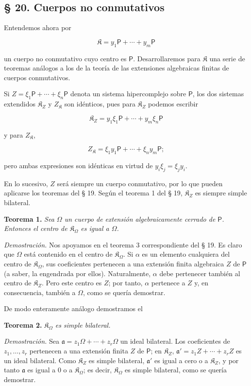 \subsection*{§ 20. Cuerpos no conmutativos}\label{nichtkommutative-koerper}

Entendemos ahora por

\[
\mathfrak K=y_1\mathsf P+\cdots+y_m\mathsf P
\]

un cuerpo no conmutativo cuyo centro es \(\mathsf P\). Desarrollaremos para \(\mathfrak K\) una serie de teoremas análogos a los de la teoría de las extensiones algebraicas finitas de cuerpos conmutativos.

Si \(Z=\xi_1\mathsf P+\cdots+\xi_n\mathsf P\) denota un sistema hipercomplejo sobre \(\mathsf P\), los dos sistemas extendidos \(\mathfrak K_Z\) y \(Z_{\mathfrak K}\) son idénticos, pues para \(\mathfrak K_Z\) podemos escribir

\[
\mathfrak K_Z=y_1\xi_1\mathsf P+\cdots+y_m\xi_n\mathsf P
\]

y para \(Z_{\mathfrak K}\),

\[
Z_{\mathfrak K}=\xi_1y_1\mathsf P+\cdots+\xi_ny_m\mathsf P;
\]

pero ambas expresiones son idénticas en virtud de \(y_i\xi_j=\xi_jy_i\).

En lo sucesivo, \(Z\) será siempre un cuerpo conmutativo, por lo que pueden aplicarse los teoremas del § 19. Según el teorema 1 del § 19, \(\mathfrak K_Z\) es siempre simple bilateral.

\textbf{Teorema 1.} \emph{Sea \(\Omega\) un cuerpo de extensión algebraicamente cerrado de \(\mathsf P\). Entonces el centro de \(\mathfrak K_\Omega\) es igual a \(\Omega\).}

\emph{Demostración.} Nos apoyamos en el teorema 3 correspondiente del § 19. Es claro que \(\Omega\) está contenido en el centro de \(\mathfrak K_\Omega\). Si \(\alpha\) es un elemento cualquiera del centro de \(\mathfrak K_\Omega\), sus coeficientes pertenecen a una extensión finita algebraica \(Z\) de \(\mathsf P\) (a saber, la engendrada por ellos). Naturalmente, \(\alpha\) debe pertenecer también al centro de \(\mathfrak K_Z\). Pero este centro es \(Z\); por tanto, \(\alpha\) pertenece a \(Z\) y, en consecuencia, también a \(\Omega\), como se quería demostrar.

De modo enteramente análogo demostramos el

\textbf{Teorema 2.} \emph{\(\mathfrak K_\Omega\) es simple bilateral.}

\emph{Demostración.} Sea \(\mathfrak a=z_1\Omega+\cdots+z_r\Omega\) un ideal bilateral. Los coeficientes de \(z_1,\ldots,z_r\) pertenecen a una extensión finita \(Z\) de \(\mathsf P\); en \(\mathfrak K_Z\), \(\mathfrak a'=z_1Z+\cdots+z_rZ\) es un ideal bilateral. Como \(\mathfrak K_Z\) es simple bilateral, \(\mathfrak a'\) es igual a cero o a \(\mathfrak K_Z\), y por tanto \(\mathfrak a\) es igual a \(0\) o a \(\mathfrak K_\Omega\); es decir, \(\mathfrak K_\Omega\) es simple bilateral, como se quería demostrar.

